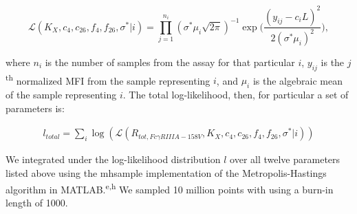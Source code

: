 \begin{equation}
\mathcal{L}(K_X,c_4,c_{26},f_4,f_{26},\sigma^*|i) = \prod_{j=1}^{n_i}{(\sigma^*\mu_i\sqrt{2\pi})^{-1}\exp{\Big(\frac{(y_{ij}-c_iL)^2}{2(\sigma^*\mu_i)^2}\Big)}},
\end{equation}

where $n_i$ is the number of samples from the assay for that particular $i$, $y_{ij}$ is the $j$\textsuperscript{th} normalized MFI from the sample representing $i$, and $\mu_i$ is the algebraic mean of the sample representing $i$. The total log-likelihood, then, for particular a set of parameters is:

\begin{equation}
\begin{split}
l_{total}=\sum_i\log(\mathcal{L}(R_{tot,Fc\gamma RIIIA-158V},K_X,c_4,c_{26},f_4,f_{26},\sigma^*|i))
\end{split}
\end{equation}
 
We integrated under the log-likelihood distribution $l$ over all twelve parameters listed above using the mhsample implementation of the Metropolis-Hastings algorithm in MATLAB.\textsuperscript{e,h} We sampled 10 million points with using a burn-in length of 1000.